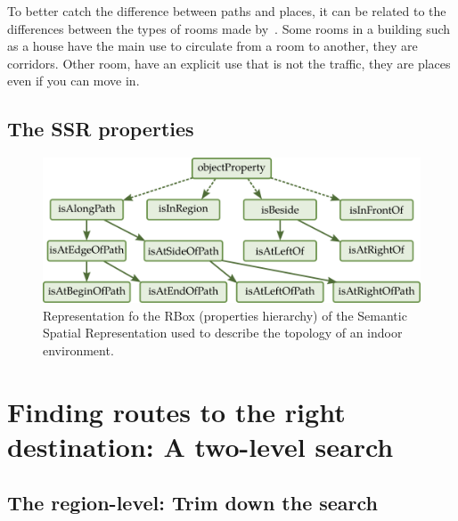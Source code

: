 To better catch the difference between paths and places, it can be related to the differences between the types of rooms made by~\cite{andresen_2016_wayfinding}. Some rooms in a building such as a house have the main use to circulate from a room to another, they are corridors. Other room, have an explicit use that is not the traffic, they are places even if you can move in.

\subsection{The SSR properties}

\begin{figure}[ht!]
\centering
\includegraphics[scale=0.4]{figures/chapter3/ssr_rbox.png}
\caption{\label{fig:chap3_rbox} Representation fo the RBox (properties hierarchy) of the Semantic Spatial Representation used to describe the topology of an indoor environment.}
\end{figure}


\section{Finding routes to the right destination: A two-level search}

\subsection{The region-level: Trim down the search}

